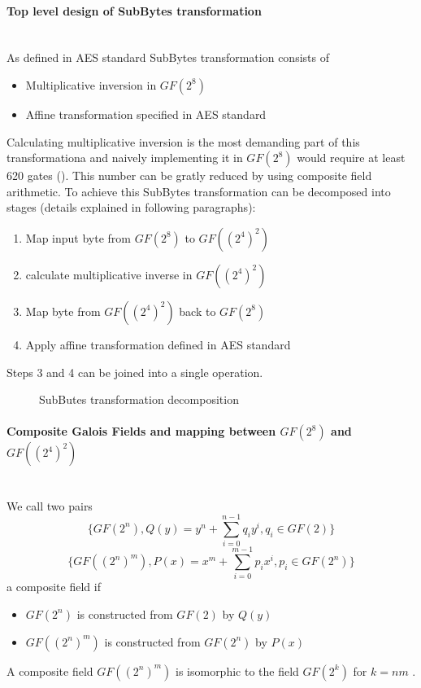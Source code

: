 \paragraph{Top level design of SubBytes transformation}\mbox{}\\
As defined in AES standard \cite{aes-snadard} SubBytes transformation consists of
\begin{itemize}[nolistsep]
\item Multiplicative inversion in $GF(2^8)$
\item Affine transformation specified in AES standard \cite{aes-standard}
\end{itemize}
Calculating multiplicative inversion is the most demanding part of this transformationa and naively implementing it in $GF(2^8)$ would require at least 620 gates (\cite{vlsi}). This number can be gratly reduced by using composite field arithmetic. To achieve this SubBytes transformation can be decomposed into stages (details explained in following paragraphs):
\begin{enumerate}[nolistsep]
\item Map input byte from $GF(2^8)$ to $GF((2^4)^2)$ 
\item calculate multiplicative inverse in $GF((2^4)^2)$
\item Map byte from $GF((2^4)^2)$ back to $GF(2^8)$
\item Apply affine transformation defined in AES standard \cite{aes-standard}
\end{enumerate}

Steps 3 and 4 can be joined into a single operation.

\begin{figure}[!h]
\missingfigure[figwidth=6cm]{}
\caption{SubButes transformation decomposition}
\end{figure}

\paragraph{Composite Galois Fields and mapping between $GF(2^8)$ and $GF((2^4)^2)$}\mbox{}\\
We call two pairs
\begin{equation*}
\{GF(2^n), Q(y) = y^n + \sum_{i=0}^{n-1} q_i y^i, q_i \in GF(2) \}
\end{equation*}
\begin{equation*}
\{GF((2^n)^m), P(x) = x^m + \sum_{i=0}^{m-1} p_i x^i, p_i \in GF(2^n) \}
\end{equation*}
a composite field \cite{vlsi} if 
\begin{itemize}[nolistsep]
\item $GF(2^n)$ is constructed from $GF(2)$ by $Q(y)$
\item $GF((2^n)^m)$ is constructed from $GF(2^n)$ by $P(x)$
\end{itemize}
A composite field $GF((2^n)^m)$ is isomorphic to the field $GF(2^k)$ for $k = nm$ \cite{vlsi}.

